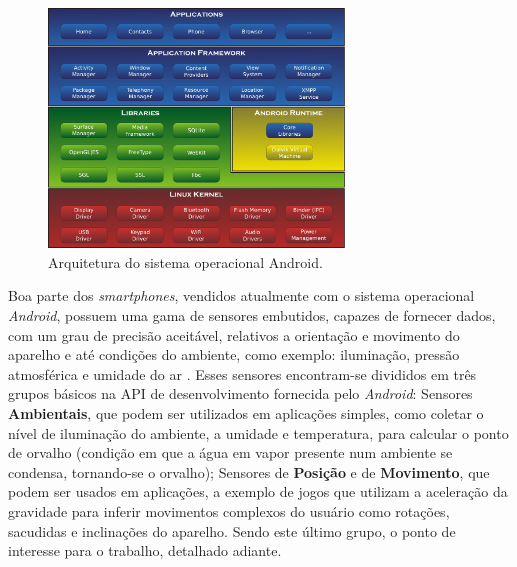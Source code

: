\begin{figure}[H]
	\centering
		\includegraphics[width=0.7\textwidth]{figuras/android_sys_arch.pdf}
		\caption{Arquitetura do sistema operacional Android.}
		\label{fig:androidsysarch}
\end{figure}

Boa parte dos \textit{smartphones}, vendidos atualmente com o sistema operacional \textit{Android}, possuem uma gama de sensores embutidos, capazes de fornecer dados, com um grau de precisão aceitável, relativos a orientação e movimento do aparelho e até condições do ambiente, como exemplo: iluminação, pressão atmosférica e umidade do ar . Esses sensores encontram-se divididos em três grupos básicos na API de desenvolvimento fornecida pelo \textit{Android}: Sensores \textbf{Ambientais}, que podem ser utilizados em aplicações simples, como coletar o nível de iluminação do ambiente, a umidade e temperatura, para calcular o ponto de orvalho (condição em que a água em vapor presente num ambiente se condensa, tornando-se o orvalho); Sensores de \textbf{Posição} e de \textbf{Movimento}, que podem ser usados em aplicações, a exemplo de jogos que utilizam a aceleração da gravidade para inferir movimentos complexos do usuário como rotações, sacudidas e inclinações do aparelho. Sendo este último grupo, o ponto de interesse para o trabalho, detalhado adiante.\par


